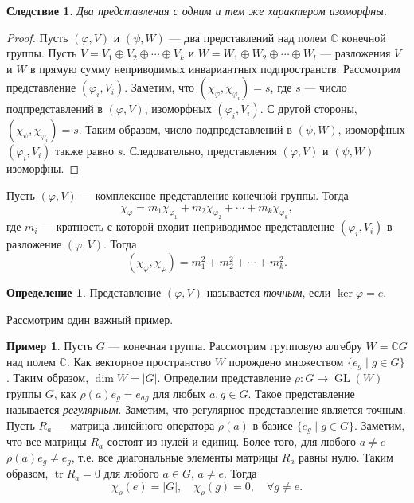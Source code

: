 \documentclass[12pt, titlepage, oneside]{amsbook}
\newcommand{\GL}{\operatorname{GL}}
\newcommand{\tr}{\operatorname{tr}}
\newcommand{\CC}{\mathbb{C}}
\newtheorem{corollary}[theorem]{Следствие}
\theoremstyle{definition}
\newtheorem{example}[theorem]{Пример}
\newtheorem{definition}[theorem]{Определение}
\theoremstyle{remark}
\begin{document}
\begin{corollary}
	\label{HarGr4}
	Два представления с одним и тем же характером изоморфны.
\end{corollary}

\begin{proof}
	Пусть $(\varphi,V)$ и $(\psi,W)$ --- два представлений над полем $\CC$ конечной группы. Пусть $V=V_1\oplus V_2\oplus\cdots\oplus V_k$ и $W=W_1\oplus W_2\oplus\cdots\oplus W_l$ --- разложения $V$ и $W$ в прямую сумму неприводимых инвариантных подпространств. Рассмотрим представление $(\varphi_i,V_i)$. Заметим, что $(\chi_{\varphi},\chi_{\varphi_i})=s$, где $s$ --- число подпредставлений в $(\varphi,V)$, изоморфных $(\varphi_i,V_i)$. С другой стороны, $(\chi_{\psi},\chi_{\varphi_i})=s$. Таким образом, число подпредставлений в $(\psi,W)$, изоморфных $(\varphi_i,V_i)$ также равно $s$. Следовательно, представления $(\varphi,V)$ и $(\psi,W)$ изоморфны.
\end{proof}

Пусть $(\varphi,V)$ --- комплексное представление конечной группы. Тогда $$\chi_{\varphi}=m_1\chi_{\varphi_1}+m_2\chi_{\varphi_2}+\cdots+m_k\chi_{\varphi_k},$$ где $m_i$ --- кратность с которой входит неприводимое представление $(\varphi_i,V_i)$ в разложение $(\varphi,V)$. Тогда $$(\chi_{\varphi},\chi_{\varphi})=m_1^2+m_2^2+\cdots+m_k^2.$$

\begin{definition}
	Представление $(\varphi,V)$ называется \emph{точным}, если $\ker\varphi=e$.
\end{definition}

Рассмотрим один важный пример.

\begin{example}
	\label{PrPr}
	Пусть $G$ --- конечная группа. Рассмотрим групповую алгебру $W=\CC G$ над полем $\CC$. Как векторное пространство $W$ порождено множеством $\{e_g\mid g\in G\}$. Таким образом, $\dim W=|G|$. Определим представление $\rho\colon G\rightarrow\GL(W)$ группы $G$, как $\rho(a)e_g=e_{ag}$ для любых $a,g\in G$. Такое представление называется \emph{регулярным}. Заметим, что регулярное представление является точным. Пусть $R_a$ --- матрица линейного оператора $\rho(a)$ в базисе $\{e_g\mid g\in G\}$. Заметим, что все матрицы $R_a$ состоят из нулей и единиц. Более того, для любого $a\neq e$ $\rho(a)e_g\neq e_{g}$, т.е. все диагональные элементы матрицы $R_a$ равны нулю. Таким образом, $\tr R_a=0$ для любого $a\in G$, $a\neq e$. Тогда $$\chi_{\rho}(e)=|G|,\quad \chi_{\rho}(g)=0,\quad \forall g\neq e.$$
\end{example}
\end{document}
